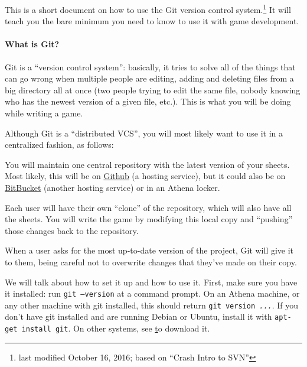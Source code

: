 \documentclass[green]{testgame}
\begin{document}
\newcommand{\ter}[1]{\fbox{\parbox{6.5in}{{\tt #1}}}}


This is a short document on how to use the Git version control
system.\footnote{last modified October 16, 2016; based on ``Crash Intro to SVN''} It will teach you the
bare minimum you need to know to use it with game development.

\paragraph*{What is Git?}

Git is a ``version control system'': basically,
it tries to solve all of the things that can go wrong when multiple
people are editing, adding and deleting files from a big directory all
at once (two people trying to edit the same file, nobody knowing who
has the newest version of a given file, etc.). This is what you will
be doing while writing a game.

Although Git is a ``distributed VCS'', you will most likely want to use it in a centralized fashion, as follows:


\begin{itemz}[]

\item You will maintain one central repository with the latest version of your sheets. Most likely, this will be on \href{https://github.com}{Github} (a hosting service), but it could also be on \href{https://bitbucket.org/}{BitBucket} (another hosting service) or in an Athena locker.

\item Each user will have their own ``clone'' of the repository, which will also have all the sheets. You will write the game by modifying this local copy and ``pushing'' those changes back to the repository.

\item When a user asks for the most up-to-date version of the project, Git will give it to them, being careful not to overwrite changes that they've made on their copy.

\end{itemz}

We will talk about how to set it up and how to use it. First, make sure you have it installed: run \texttt{git --version} at a command prompt. On an Athena machine, or any other machine with git installed, this should return \texttt{git version \textit{...}}. If you don't have git installed and are running Debian or Ubuntu, install it with \texttt{apt-get install git}. On other systems, see \href{https://git-scm.com/downloads} to download it.
\end{document}
